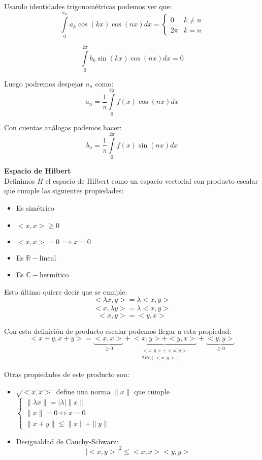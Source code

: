\documentclass[openany]{book}
\begin{document}
Usando identidades trigonométricas podemos ver que:
$$ \int\limits_{0}^{2 \pi}a_{k} \cos(kx)\cos(nx)dx = \left\{
\begin{array}{lr}
  0 &  k \ne n\\ 
  2\pi  & k = n
\end{array}
\right. $$

$$ \int\limits_{0}^{2\pi}b_{k} \sin(kx) \cos(nx) dx = 0 $$

Luego podremos despejar $ a_n $ como:
$$  a_n = \dfrac{1}{\pi} \int\limits_{0}^{2\pi}f(x) \cos(nx)dx  $$

Con cuentas análogas podemos hacer:
$$ b_n = \dfrac{1}{\pi} \int\limits_{0}^{2\pi}f(x) \sin(nx)dx $$

\begin{definition}
  \textbf{Espacio de Hilbert}\\ 
  Definimos $ H $ el espacio de Hilbert como un espacio vectorial con producto escalar que cumple las siguientes propiedades:
  \begin{itemize}
    \item Es simétrico
    \item $ <x,x> \geq  0 $
    \item $ <x,x> =0 \implies x = 0 $
    \item Es $ \mathbb{R}-$lineal
    \item Es $ \mathbb{C}-$hermítico
  \end{itemize}
  Esto último quiere decir que se cumple:
  $$ <\lambda x,y> = \lambda <x,y> $$
  $$ <x,\lambda y> = \overline{\lambda} <x,y> $$
  $$ <x,y> = \overline{<y,x>} $$
\end{definition}

Con esta definición de producto escalar podemos llegar a esta propiedad:
$$ <x+y,x+y> = \underbrace{<x,x>}_{\geq 0} + \underbrace{<x,y> + <y,x>}_{\substack{<x,y>+\overline{<x,y>}\\2Re(<x,y>)}} + \underbrace{<y,y>}_{\geq  0} $$

Otras propiedades de este producto son:

\begin{itemize}
  \item $ \sqrt{<x,x>} $ define una norma $ \|x\|  $ que cumple $ \left\{
  \begin{array}{l}
    \|\lambda x\| = |\lambda|\|x\|\\ 
    \|x\| = 0 \iff x = 0\\
    \|x+y\| \leq  \|x\| + \|y\|
  \end{array}
  \right. $
  \item Desigualdad de Cauchy-Schwarz:
    $$ |<x,y>|^2 \leq  <x,x><y,y> $$
\end{itemize}
\end{document}
